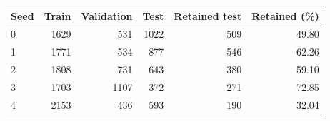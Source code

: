 \begin{tabular}{lrrrrr}
\toprule
Seed & Train & Validation & Test & Retained test & Retained (\%)\\
\midrule
0 & 1629 & 531 & 1022 & 509 & 49.80\\
1 & 1771 & 534 & 877 & 546 & 62.26\\
2 & 1808 & 731 & 643 & 380 & 59.10\\
3 & 1703 & 1107 & 372 & 271 & 72.85\\
4 & 2153 & 436 & 593 & 190 & 32.04\\
\bottomrule
\end{tabular}

